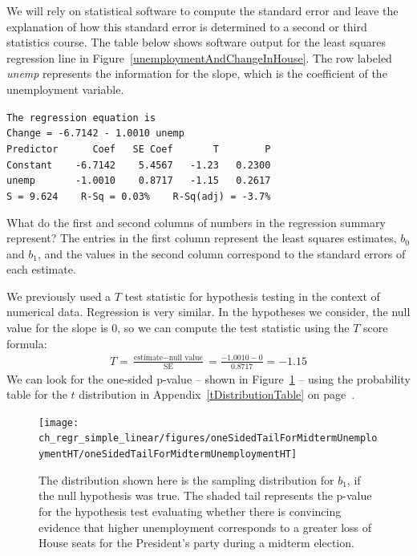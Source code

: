 We will rely on statistical software to compute the standard error and leave the explanation of how this standard error is determined to a second or third statistics course. The table below shows software output for the least squares regression line in Figure~\ref{unemploymentAndChangeInHouse}. The row labeled \emph{unemp} represents the information for the slope, which is the coefficient of the unemployment variable.

\begin{tipBox}{\texttt{The regression equation is} \\

\texttt{Change = -6.7142 - 1.0010 unemp} \\

\texttt{Predictor \ \ \ \ \ Coef \ \ SE Coef \ \ \ \ \ \ T \ \ \ \ \ \ \ P} \\
\texttt{Constant \ \ \ -6.7142 \ \ \ 5.4567 \ \ -1.23 \ \ 0.2300} \\
\texttt{unemp \ \ \ \ \ \ -1.0010 \ \ \ 0.8717 \ \ -1.15 \ \ 0.2617} \\

\texttt{S = 9.624\ \ \ \ R-Sq = 0.03\% \ \ \ R-Sq(adj) = -3.7\%}}
\end{tipBox}

\begin{example}{What do the first and second columns of numbers in the regression summary represent?}
The entries in the first column represent the least squares estimates, $b_0$ and $b_1$, and the values in the second column correspond to the standard errors of each estimate.
\end{example}

We previously used a $T$ test statistic for hypothesis testing in the context of numerical data. Regression is very similar. In the hypotheses we consider, the null value for the slope is 0, so we can compute the test statistic using the $T$ score formula:
\begin{align*}
T = \frac{\text{estimate} - \text{null value}}{\text{SE}} = \frac{-1.0010 - 0}{0.8717} = -1.15
\end{align*}
We can look for the one-sided p-value -- shown in Figure~\ref{oneSidedTailForMidtermUnemploymentHT} -- using the probability table for the $t$ distribution in Appendix~\ref{tDistributionTable} on page~\pageref{tDistributionTable}.

\begin{figure}
\centering
\texttt{[image: ch\_regr\_simple\_linear/figures/oneSidedTailForMidtermUnemploymentHT/oneSidedTailForMidtermUnemploymentHT]}
\caption{The distribution shown here is the sampling distribution for $b_1$, if the null hypothesis was true. The shaded tail represents the p-value for the hypothesis test evaluating whether there is convincing evidence that higher unemployment corresponds to a greater loss of House seats for the President's party during a midterm election.}
\label{oneSidedTailForMidtermUnemploymentHT}
\end{figure}

